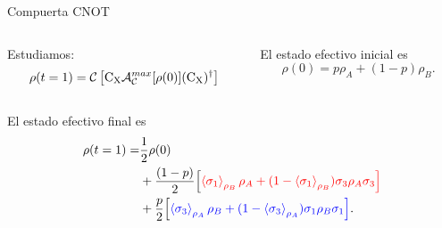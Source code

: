 \begin{frame}{Compuerta CNOT}
    \begin{columns}
        \begin{column}{0.5\textwidth}
            Estudiamos:
            \begin{equation}
                \rho(t=1)=\mathcal{C}\left[\text{C}_{\text{X}} \mathcal{A}_{\mathcal{C}}^{max}[\rho(0)](\text{C}_{\text{X}})^{\dag}\right]\nonumber
            \end{equation}
        \end{column}\pause
        \begin{column}{0.5\textwidth}
            El estado efectivo inicial es
            \begin{equation}
                \rho(0)=p\rho_{A}+(1-p)\rho_{B}.\nonumber
            \end{equation}
        \end{column}\pause
    \end{columns}
    El estado efectivo final es\pause
    \begin{align*}
        \rho(t=1)=&\frac{1}{2}\rho(0)\\
        &+\frac{(1-p)}{2}\qty[{\color{red}\expval{\sigma_{1}}_{\rho_{B}}\rho_{A}+(1-\expval{\sigma_{1}}_{\rho_{B}})\sigma_{3}\rho_{A}\sigma_{3}}]\\
        &+\frac{p}{2}\qty[{\color{blue}\expval{\sigma_{3}}_{\rho_{A}}\rho_{B}+(1-\expval{\sigma_{3}}_{\rho_{A}})\sigma_{1}\rho_{B}\sigma_{1}}].
    \end{align*}\pause
\end{frame}
